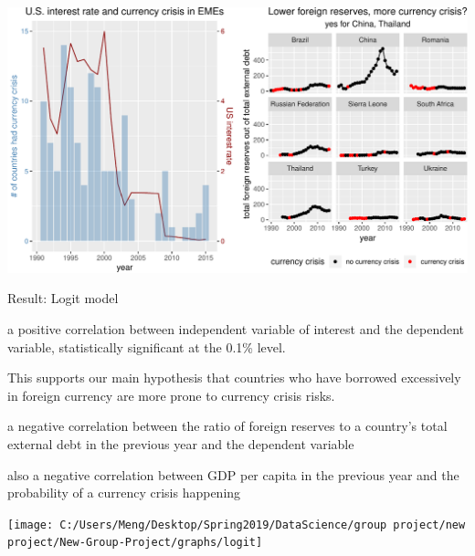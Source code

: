 \documentclass[ignorenonframetext,]{beamer}
\begin{document}
\begin{frame}

\begin{center}\includegraphics{beamer-pre_files/figure-beamer/unnamed-chunk-9-1} \end{center}

\end{frame}

\begin{frame}{Result: Logit model}

a positive correlation between independent variable of interest and the
dependent variable, statistically significant at the 0.1\% level.

This supports our main hypothesis that countries who have borrowed
excessively in foreign currency are more prone to currency crisis risks.

a negative correlation between the ratio of foreign reserves to a
country's total external debt in the previous year and the dependent
variable

also a negative correlation between GDP per capita in the previous year
and the probability of a currency crisis happening

\end{frame}

\begin{frame}

\begin{center}\texttt{[image: C:/Users/Meng/Desktop/Spring2019/DataScience/group project/new project/New-Group-Project/graphs/logit]} \end{center}

\end{frame}
\end{document}
